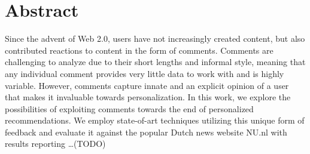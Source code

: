 \chapter*{Abstract}
Since the advent of Web 2.0, users have not increasingly created content, but also contributed reactions to content in the form of comments. Comments are challenging to analyze due to their short lengths and informal style, meaning that any individual comment provides very little data to work with and is highly variable. However, comments capture innate and an explicit opinion of a user that makes it invaluable towards personalization. In this work, we explore the possibilities of exploiting comments towards the end of personalized recommendations. We employ state-of-art techniques utilizing this unique form of feedback and evaluate it against the popular Dutch news website NU.nl with results reporting \ldots (TODO)